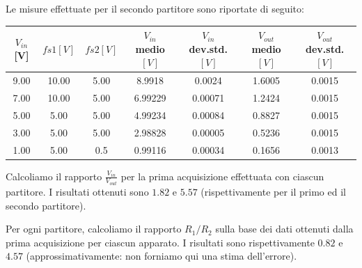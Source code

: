 

Le misure effettuate per il secondo partitore sono riportate di seguito:
\begin{center}
\begin{tabular}{|c|c|c|c|c|c|c|}
\hline
$V_{in}$ [V]          &$fs1 [V]$        &$fs2 [V]$        &$V_{in}$ medio $[V]$        &$V_{in}$ dev.std. $[V]$        &$V_{out}$ medio $[V]$        &$V_{out}$ dev.std. $[V]$\\
\hline
9.00           &10.00    &5.00        &8.9918    &0.0024    &1.6005    &0.0015\\
7.00         &10.00    &5.00    &6.99229    &0.00071    &1.2424    &0.0015\\
5.00           &5.00    &5.00     &4.99234    &0.00084    &0.8827    &0.0015\\ 
3.00         &5.00    &5.00    &2.98828    &0.00005    &0.5236    &0.0015\\
1.00         &5.00    &0.5    &0.99116    &0.00034    &0.1656     &0.0013\\
\hline
\end{tabular}
\end{center}

Calcoliamo il rapporto $\frac{V_{in}}{V_{out}}$ per la prima acquisizione effettuata con ciascun partitore. I risultati ottenuti sono $1.82$ e $5.57$ (rispettivamente per il primo ed il secondo partitore).


Per ogni partitore, calcoliamo il rapporto ${R_1}/{R_2}$ sulla base dei dati ottenuti dalla prima acquisizione per ciascun apparato. I risultati sono rispettivamente $0.82$ e $4.57$ (approssimativamente: non forniamo qui una stima dell'errore).

